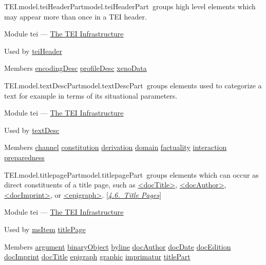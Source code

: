 \begin{reflist}
\item[]\begin{specHead}{TEI.model.teiHeaderPart}{model.teiHeaderPart} groups high level elements which may appear more than once in a TEI header.\end{specHead} 
    \item[{Module}]
  tei — \hyperref[ST]{The TEI Infrastructure}
    \item[{Used by}]
  \hyperref[TEI.teiHeader]{teiHeader}
    \item[{Members}]
  \hyperref[TEI.encodingDesc]{encodingDesc} \hyperref[TEI.profileDesc]{profileDesc} \hyperref[TEI.xenoData]{xenoData}
\end{reflist}  
\begin{reflist}
\item[]\begin{specHead}{TEI.model.textDescPart}{model.textDescPart} groups elements used to categorize a text for example in terms of its situational parameters.\end{specHead} 
    \item[{Module}]
  tei — \hyperref[ST]{The TEI Infrastructure}
    \item[{Used by}]
  \hyperref[TEI.textDesc]{textDesc}
    \item[{Members}]
  \hyperref[TEI.channel]{channel} \hyperref[TEI.constitution]{constitution} \hyperref[TEI.derivation]{derivation} \hyperref[TEI.domain]{domain} \hyperref[TEI.factuality]{factuality} \hyperref[TEI.interaction]{interaction} \hyperref[TEI.preparedness]{preparedness}
\end{reflist}  
\begin{reflist}
\item[]\begin{specHead}{TEI.model.titlepagePart}{model.titlepagePart} groups elements which can occur as direct constituents of a title page, such as \hyperref[TEI.docTitle]{<docTitle>}, \hyperref[TEI.docAuthor]{<docAuthor>}, \hyperref[TEI.docImprint]{<docImprint>}, or \hyperref[TEI.epigraph]{<epigraph>}. [\textit{\hyperref[DSTITL]{4.6.\ Title Pages}}]\end{specHead} 
    \item[{Module}]
  tei — \hyperref[ST]{The TEI Infrastructure}
    \item[{Used by}]
  \hyperref[TEI.msItem]{msItem} \hyperref[TEI.titlePage]{titlePage}
    \item[{Members}]
  \hyperref[TEI.argument]{argument} \hyperref[TEI.binaryObject]{binaryObject} \hyperref[TEI.byline]{byline} \hyperref[TEI.docAuthor]{docAuthor} \hyperref[TEI.docDate]{docDate} \hyperref[TEI.docEdition]{docEdition} \hyperref[TEI.docImprint]{docImprint} \hyperref[TEI.docTitle]{docTitle} \hyperref[TEI.epigraph]{epigraph} \hyperref[TEI.graphic]{graphic} \hyperref[TEI.imprimatur]{imprimatur} \hyperref[TEI.titlePart]{titlePart}
\end{reflist}  